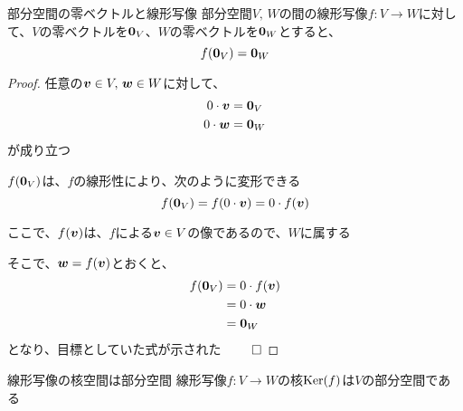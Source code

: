 \documentclass[../../../topic_linear-algebra]{subfiles}
\begin{document}
\begin{theorem}{部分空間の零ベクトルと線形写像}\label{thm:linear-map-zero-preserving}
  部分空間$V,\,W$の間の線形写像$f\colon V \to W$に対して、$V$の零ベクトルを$\vb*{0}_V$、$W$の零ベクトルを$\vb*{0}_W$とすると、
  \begin{equation*}
    f(\vb*{0}_V) = \vb*{0}_W
  \end{equation*}
\end{theorem}

\begin{proof}
  任意の$\vb*{v} \in V,\, \vb*{w} \in W$に対して、
  \begin{align*}
    0  \cdot \vb*{v} & = \vb*{0}_V \\
    0 \cdot \vb*{w}  & = \vb*{0}_W
  \end{align*}
  が成り立つ

  \br

  $f(\vb*{0}_V)$は、$f$の線形性により、次のように変形できる
  \begin{equation*}
    f(\vb*{0}_V) = f(0 \cdot \vb*{v}) = 0 \cdot f(\vb*{v})
  \end{equation*}

  ここで、$f(\vb*{v})$は、$f$による$\vb*{v} \in V$の像であるので、$W$に属する

  そこで、$\vb*{w} = f(\vb*{v})$とおくと、
  \begin{align*}
    f(\vb*{0}_V) & = 0 \cdot f(\vb*{v}) \\
                 & = 0 \cdot \vb*{w}    \\
                 & = \vb*{0}_W
  \end{align*}
  となり、目標としていた式が示された $\qed$
\end{proof}


\begin{theorem}{線形写像の核空間は部分空間}
  線形写像$f\colon V \to W$の核$\operatorname{Ker}(f)$は$V$の部分空間である
\end{theorem}
\end{document}
